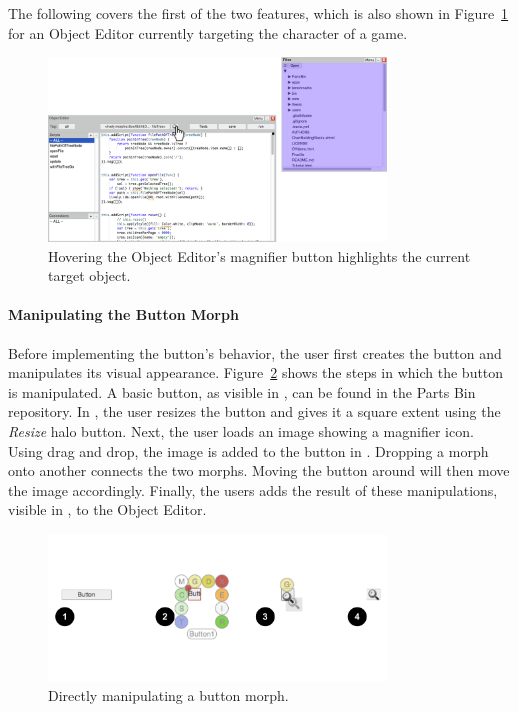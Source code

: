 The following covers the first of the two features, which is also shown in Figure~\ref{fig:MagnifierBehavior} for an Object Editor currently targeting the character of a game.

\begin{figure}[h]
    \centering
    \includegraphics[width=0.8\textwidth]{figures/3_motivation/2_magnifierBehavior.png}
    \caption{Hovering the Object Editor's magnifier button highlights the current target object.}
    \label{fig:MagnifierBehavior}
\end{figure}

\paragraph{Manipulating the Button Morph}
Before implementing the button's behavior, the user first creates the button and manipulates its visual appearance.
Figure~\ref{fig:ButtonBuilding} shows the steps in which the button is manipulated.
A basic button, as visible in , can be found in the Parts Bin repository.
In , the user resizes the button and gives it a square extent using the \emph{Resize} halo button.
Next, the user loads an image showing a magnifier icon.
Using drag and drop, the image is added to the button in .
Dropping a morph onto another connects the two morphs.
Moving the button around will then move the image accordingly.
Finally, the users adds the result of these manipulations, visible in , to the Object Editor.

\begin{figure}[h]
    \centering
    \includegraphics[width=0.8\textwidth]{figures/3_motivation/3_buildingTheButton.pdf}
    \caption{Directly manipulating a button morph.}
    \label{fig:ButtonBuilding}
\end{figure}

